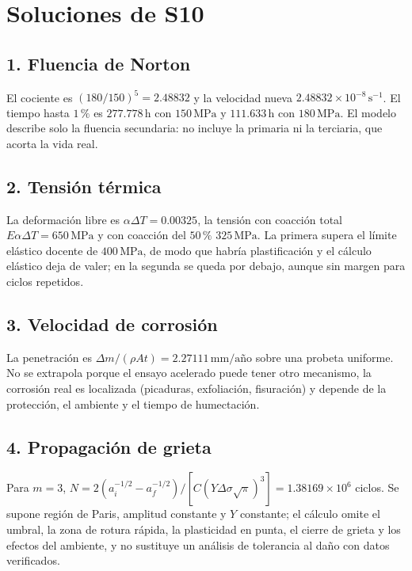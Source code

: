 

\chapter{Soluciones de S10}
\section{1. Fluencia de Norton}
El cociente es $(180/150)^5=2.48832$ y la velocidad nueva $2.48832\times10^{-8}\,\mathrm{s^{-1}}$. El tiempo hasta $1\,\%$ es $277.778\,\mathrm h$ con $150\,\mathrm{MPa}$ y $111.633\,\mathrm h$ con $180\,\mathrm{MPa}$. El modelo describe solo la fluencia secundaria: no incluye la primaria ni la terciaria, que acorta la vida real.

\section{2. Tensión térmica}
La deformación libre es $\alpha\Delta T=0.00325$, la tensión con coacción total $E\alpha\Delta T=650\,\mathrm{MPa}$ y con coacción del $50\,\%$ $325\,\mathrm{MPa}$. La primera supera el límite elástico docente de $400\,\mathrm{MPa}$, de modo que habría plastificación y el cálculo elástico deja de valer; en la segunda se queda por debajo, aunque sin margen para ciclos repetidos.

\section{3. Velocidad de corrosión}
La penetración es $\Delta m/(\rho At)=2.27111\,\mathrm{mm/año}$ sobre una probeta uniforme. No se extrapola porque el ensayo acelerado puede tener otro mecanismo, la corrosión real es localizada (picaduras, exfoliación, fisuración) y depende de la protección, el ambiente y el tiempo de humectación.

\section{4. Propagación de grieta}
Para $m=3$, $N=2(a_i^{-1/2}-a_f^{-1/2})/[C(Y\Delta\sigma\sqrt\pi)^3]=1.38169\times10^{6}$ ciclos. Se supone región de Paris, amplitud constante y $Y$ constante; el cálculo omite el umbral, la zona de rotura rápida, la plasticidad en punta, el cierre de grieta y los efectos del ambiente, y no sustituye un análisis de tolerancia al daño con datos verificados.


